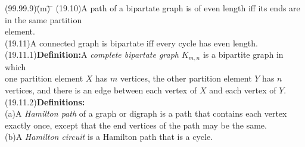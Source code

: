 \documentclass{amsart}
\newcommand{\lgap}{2pt}                             %
\newcommand{\llgap}{6pt}                            %
\begin{document}
\newpage

\begin{tabbing}
(99.99.9)\;\=(m)\;\= \makebox[2in]{ } \= \kill
(19.10)\>A path of a bipartate graph is of even length iff its ends are in the same partition\\[\lgap]
       \>element.\\[\lgap]
(19.11)\>A connected graph is bipartate iff every cycle has even length.\\[\llgap]
(19.11.1)\>\textbf{Definition:}\quad A \emph{complete bipartate graph} $K_{m,n}$ is a bipartite graph in which\\[\lgap]
         \>one partition element $X$ has $m$ vertices, the other partition element $Y$ has $n$\\[\lgap]
         \> vertices, and there is an edge between each vertex of $X$ and each vertex of $Y$.\\[\llgap]
(19.11.2)\>\textbf{Definitions:}\\[\lgap]
      \>(a)\>A \emph{Hamilton path} of a graph or digraph is a path that contains each vertex\\[\lgap]
      \>   \>exactly once, except that the end vertices of the path may be the same.\\[\lgap]
      \>(b)\>A \emph{Hamilton circuit} is a Hamilton path that is a cycle.\\[\lgap]
\end{tabbing}
\end{document}
